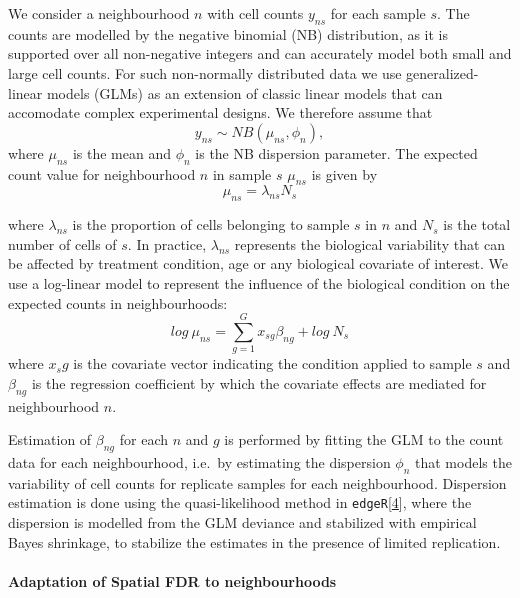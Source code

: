 \documentclass[
]{article}
\begin{document}
We consider a neighbourhood \(n\) with cell counts \(y_{ns}\) for each sample \(s\). The counts are modelled by the negative binomial (NB) distribution, as it is supported over all non-negative integers and can accurately model both small and large cell counts. For such non-normally distributed data we use generalized-linear models (GLMs) as an extension of classic linear models that can accomodate complex experimental designs. We therefore assume that
\[
y_{ns} \sim NB(\mu_{ns},\phi_{n}),
\]
where \(\mu_{ns}\) is the mean and \(\phi_{n}\) is the NB dispersion parameter.
The expected count value for neighbourhood \(n\) in sample \(s\) \(\mu_{ns}\) is given by
\[
\mu_{ns} = \lambda_{ns}N_s
\]

where \(\lambda_{ns}\) is the proportion of cells belonging to sample \(s\) in \(n\) and \(N_s\) is the total number of cells of \(s\). In practice, \(\lambda_{ns}\) represents the biological variability that can be affected by treatment condition, age or any biological covariate of interest. We use a log-linear model to represent the influence of the biological condition on the expected counts in neighbourhoods:
\[
log\ \mu_{ns} = \sum_{g=1}^{G}x_{sg}\beta_{ng} + log\ N_s
\]
where \(x_sg\) is the covariate vector indicating the condition applied to sample \(s\) and \(\beta_{ng}\) is the regression coefficient by which the covariate effects are mediated for neighbourhood \(n\).

Estimation of \(\beta_{ng}\) for each \(n\) and \(g\) is performed by fitting the GLM to the count data for each neighbourhood, i.e.~by estimating the dispersion \(\phi_{n}\) that models the variability of cell counts for replicate samples for each neighbourhood. Dispersion estimation is done using the quasi-likelihood method in \texttt{edgeR}{[}\protect\hyperlink{ref-robinsonEdgeRBioconductorPackage2010a}{4}{]}, where the dispersion is modelled from the GLM deviance and stabilized with empirical Bayes shrinkage, to stabilize the estimates in the presence of limited replication.

\hypertarget{adaptation-of-spatial-fdr-to-neighbourhoods}{%
\paragraph*{Adaptation of Spatial FDR to neighbourhoods}\label{adaptation-of-spatial-fdr-to-neighbourhoods}}
\end{document}

